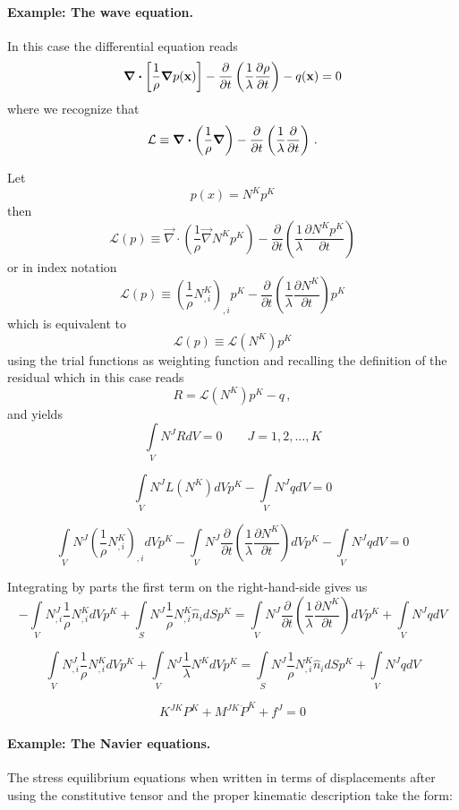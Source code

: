\paragraph*{Example: The wave equation.}
In this case the differential equation reads
\[\div \left[ \frac{1}{\rho} \grad p(\vb{x})\right] - \pdv{t} \left(\frac{1}{\lambda} \pdv{\rho}{t}\right) - q(\vb{x}) = 0\]
where we recognize that
\[\mathcal{L} \equiv \div \left(\frac{1}{\rho} \grad \right) - \pdv{t}\left(\frac{1}{\lambda}\pdv{t}\right)\, .\]

Let
\[p(x) = N^K p^K\]
then
\[\mathcal{L}(p) \equiv \vec \nabla  \cdot \left( {\frac{1}{\rho }\vec \nabla {N^K}{p^K}} \right) - \frac{\partial }{{\partial t}}\left( {\frac{1}{\lambda }\frac{{\partial {N^K}{p^K}}}{{\partial t}}} \right)\]
or in index notation
\[\mathcal{L}(p) \equiv {\left( {\frac{1}{\rho }N_{,i}^K} \right)_{,i}}{p^K} - \frac{\partial }{{\partial t}}\left( {\frac{1}{\lambda }\frac{{\partial {N^K}}}{{\partial t}}} \right){p^K}\]
which is equivalent to
\[\mathcal{L}(p) \equiv \mathcal{L}({N^K}){p^K}\]
using the trial functions as weighting function and recalling the definition of the residual which in this case reads
\[R = \mathcal{L}({N^K}){p^K} - q\, ,\]
and yields
\[\int\limits_V {{N^J}RdV = 0} \quad \quad J=1,2,...,K \]

\[\int\limits_V {{N^J}L({N^K})dV{p^K}}  - \int\limits_V {{N^J}qdV}  = 0\]

\[\int\limits_V {{N^J}{{\left( {\frac{1}{\rho }N_{,i}^K} \right)}_{,i}}dV{p^K} - \int\limits_V {{N^J}\frac{\partial }{{\partial t}}\left( {\frac{1}{\lambda }\frac{{\partial {N^K}}}{{\partial t}}} \right)dV{p^K}} }  - \int\limits_V {{N^J}qdV}  = 0\]

Integrating by parts the first term on the right-hand-side gives us
\[ - \int\limits_V {N_{,i}^J\frac{1}{\rho }N_{,i}^KdV} {p^K} + \int\limits_S {{N^J}\frac{1}{\rho }N_{,i}^K{{\hat n}_i}dS{p^K}}  = \int\limits_V {{N^J}\frac{\partial }{{\partial t}}\left( {\frac{1}{\lambda }\frac{{\partial {N^K}}}{{\partial t}}} \right)dV{p^K}}  + \int\limits_V {{N^J}qdV} \]

\[\int\limits_V {N_{,i}^J\frac{1}{\rho }N_{,i}^KdV} {p^K} + \int\limits_V {{N^J}\frac{1}{\lambda }{N^K}dV{{\ddot p}^K}}  = \int\limits_S {{N^J}\frac{1}{\rho }N_{,i}^K{{\hat n}_i}dS{p^K}}  + \int\limits_V {{N^J}qdV} \]

\[{K^{JK}}{P^K} + {M^{JK}}{{\ddot P}^K} + {f^J} = 0\]

\newpage
\paragraph*{Example: The Navier equations.}
The stress equilibrium equations when written in terms of displacements after using the constitutive tensor and the proper kinematic description take the form:

